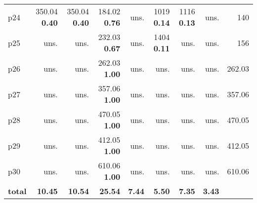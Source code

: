 \begin{tabular}{|l|rrrrrrr|r|}
p24 & {\footnotesize 350.04} \textbf{0.40} & {\footnotesize 350.04} \textbf{0.40} & {\footnotesize 184.02} \textbf{0.76} & uns. & {\footnotesize 1019} \textbf{0.14} & {\footnotesize 1116} \textbf{0.13} & uns. & 140\\
p25 & uns. & uns. & {\footnotesize 232.03} \textbf{0.67} & uns. & {\footnotesize 1404} \textbf{0.11} & uns. & uns. & 156\\
p26 & uns. & uns. & {\footnotesize 262.03} \textbf{1.00} & uns. & uns. & uns. & uns. & 262.03\\
p27 & uns. & uns. & {\footnotesize 357.06} \textbf{1.00} & uns. & uns. & uns. & uns. & 357.06\\
p28 & uns. & uns. & {\footnotesize 470.05} \textbf{1.00} & uns. & uns. & uns. & uns. & 470.05\\
p29 & uns. & uns. & {\footnotesize 412.05} \textbf{1.00} & uns. & uns. & uns. & uns. & 412.05\\
p30 & uns. & uns. & {\footnotesize 610.06} \textbf{1.00} & uns. & uns. & uns. & uns. & 610.06\\
\hline
\textbf{total} & \textbf{10.45} & \textbf{10.54} & \textbf{25.54} & \textbf{7.44} & \textbf{5.50} & \textbf{7.35} & \textbf{3.43} & \\
\hline
\end{tabular}

